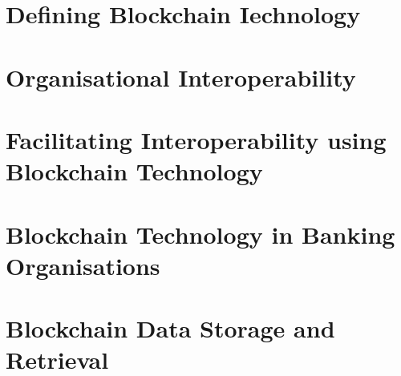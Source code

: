 \section{Defining Blockchain Iechnology}

\section{Organisational Interoperability}

\section{Facilitating Interoperability using Blockchain Technology}

\section{Blockchain Technology in Banking Organisations}

\section{Blockchain Data Storage and Retrieval}